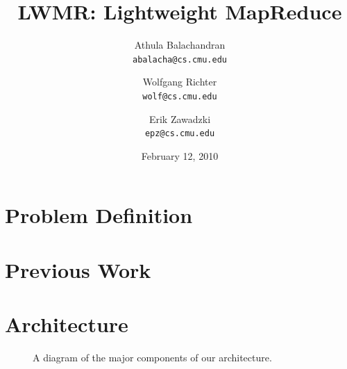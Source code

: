 \documentclass[10pt,letter,final,article,twocolumn]{article} %
\title{LWMR: Lightweight MapReduce}
\author{Athula Balachandran \\
{\tt abalacha@cs.cmu.edu}
\and
Wolfgang Richter \\
{\tt wolf@cs.cmu.edu}
\and
Erik Zawadzki \\
{\tt epz@cs.cmu.edu}}
\date{February 12, 2010} %
\begin{document}
\pagestyle{empty}
\maketitle
\thispagestyle{empty}

\section{Problem Definition}

\section{Previous Work}

\section{Architecture}



\begin{figure}[htbp]
\begin{center}
\caption{A diagram of the major components of our architecture.}
\label{fig:arch}
\end{center}
\end{figure}
\end{document}
